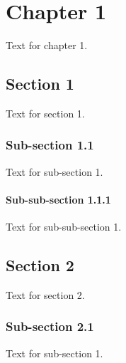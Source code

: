 \chapter{Chapter 1}\label{ch:c1}
 Text for chapter 1.

\section{Section 1}\label{sec:c11}
 Text for section 1.

 \subsection{Sub-section 1.1}
 Text for sub-section 1.

 \subsubsection{Sub-sub-section 1.1.1}
 Text for sub-sub-section 1.

\section{Section 2}\label{sec:c12}
 Text for section 2.

 \subsection{Sub-section 2.1}
 Text for sub-section 1.

